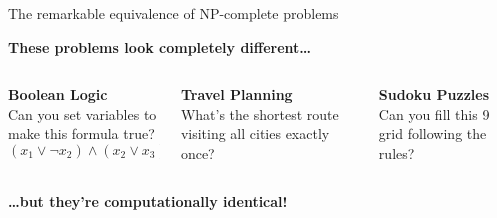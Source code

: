 \documentclass[aspectratio=169, lualatex, handout]{beamer}
\begin{document}
\begin{frame}{The remarkable equivalence of NP-complete problems}
	\begin{center}
		\Large\textbf{These problems look completely different\ldots}
		\vspace{0.5cm}

		\begin{columns}[c]
			\begin{column}{0.33\textwidth}
				\textbf{Boolean Logic}\\
				\small Can you set variables to make this formula true?\\
				$(x_1 \lor \neg x_2) \land (x_2 \lor x_3) \land \ldots$
			\end{column}
			\begin{column}{0.33\textwidth}
				\textbf{Travel Planning}\\
				\small What's the shortest route visiting all cities exactly once?
			\end{column}
			\begin{column}{0.33\textwidth}
				\textbf{Sudoku Puzzles}\\
				\small Can you fill this 9  grid following the rules?
			\end{column}
		\end{columns}
		\vspace{0.5cm}

		\Large\textbf{\ldots but they're computationally identical!}
	\end{center}
\end{frame}
\end{document}
